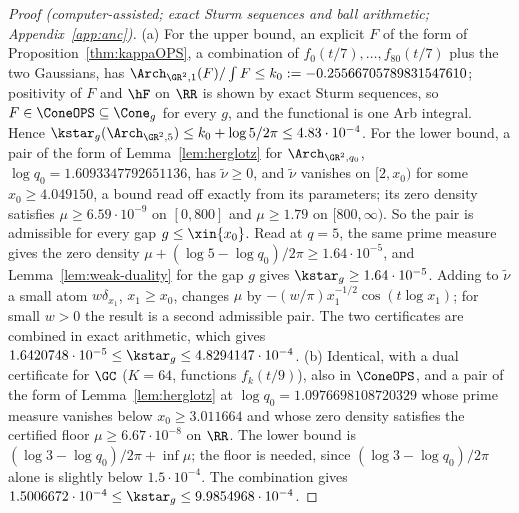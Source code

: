\begin{proof}[Proof (computer-assisted; exact Sturm sequences and ball arithmetic; Appendix~\ref{app:anc})]
(a) For the upper bound, an explicit $F$ of the form of Proposition~\ref{thm:kappaOPS}, a combination of $f_0(t/7),\dots,f_{80}(t/7)$ plus the two
Gaussians, has $\Arch_{\GR^2,1}(F)/\int F\le k_0:=-0.25566705789831547610$; positivity of $F$ and $\hF$ on $\RR$ is shown by exact Sturm sequences,
so $F\in\ConeOPS\subseteq\Cone_g$ for every $g$, and the functional is one Arb integral. Hence $\kstar_g(\Arch_{\GR^2,5})\le k_0+\log5/2\pi\le4.83\cdot10^{-4}$.
For the lower bound, a pair of the form of Lemma~\ref{lem:herglotz} for $\Arch_{\GR^2,q_0}$, $\log q_0=1.6093347792651136$, has $\tilde\nu\ge0$, and
$\tilde\nu$ vanishes on $[2,x_0)$ for some $x_0\ge4.049150$, a bound read off exactly from its parameters; its zero density satisfies
$\mu\ge6.59\cdot10^{-9}$ on $[0,800]$ and $\mu\ge1.79$ on $[800,\infty)$. So the pair is admissible for every gap $g\le\xin{x_0}$. Read at $q=5$, the
same prime measure gives the zero density $\mu+(\log5-\log q_0)/2\pi\ge1.64\cdot10^{-5}$, and Lemma~\ref{lem:weak-duality} for the gap $g$ gives
$\kstar_g\ge1.64\cdot10^{-5}$. Adding to $\tilde\nu$ a small atom $w\delta_{x_1}$, $x_1\ge x_0$, changes $\mu$ by $-(w/\pi)x_1^{-1/2}\cos(t\log x_1)$; for
small $w>0$ the result is a second admissible pair. The two certificates are combined in exact arithmetic, which gives
$1.6420748\cdot10^{-5}\le\kstar_g\le4.8294147\cdot10^{-4}$.
(b) Identical, with a dual certificate for $\GC$ ($K=64$, functions $f_k(t/9)$), also in $\ConeOPS$, and a pair of the form of
Lemma~\ref{lem:herglotz} at $\log q_0=1.0976698108720329$ whose prime measure vanishes below $x_0\ge3.011664$ and whose zero density satisfies the
certified floor $\mu\ge6.67\cdot10^{-8}$ on $\RR$. The lower bound is $(\log3-\log q_0)/2\pi+\inf\mu$; the floor is needed, since
$(\log3-\log q_0)/2\pi$ alone is slightly below $1.5\cdot10^{-4}$. The combination gives $1.5006672\cdot10^{-4}\le\kstar_g\le9.9854968\cdot10^{-4}$.
\end{proof}

